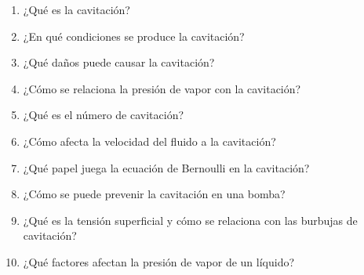 \documentclass[../main]{subfiles}
\begin{document}

\begin{enumerate}
\item ¿Qué es la cavitación?
\item ¿En qué condiciones se produce la cavitación?
\item ¿Qué daños puede causar la cavitación?
\item ¿Cómo se relaciona la presión de vapor con la cavitación?
\item ¿Qué es el número de cavitación?
\item ¿Cómo afecta la velocidad del fluido a la cavitación?
\item ¿Qué papel juega la ecuación de Bernoulli en la cavitación?
\item ¿Cómo se puede prevenir la cavitación en una bomba?
\item ¿Qué es la tensión superficial y cómo se relaciona con las burbujas de cavitación?
\item ¿Qué factores afectan la presión de vapor de un líquido?
\end{enumerate}
\end{document}
